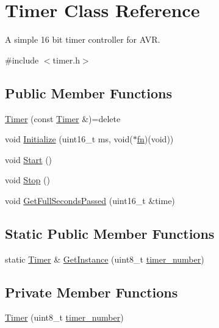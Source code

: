 \hypertarget{class_timer}{}\section{Timer Class Reference}
\label{class_timer}


A simple 16 bit timer controller for A\+VR.  




{\ttfamily \#include $<$timer.\+h$>$}

\subsection*{Public Member Functions}
\begin{DoxyCompactItemize}
\item 
\hyperlink{class_timer_ae6b73141ad1d5029d3782d14d2fd5ff0}{Timer} (const \hyperlink{class_timer}{Timer} \&)=delete
\item 
void \hyperlink{class_timer_a04ed0eb1468656c271645c2165bbe147}{Initialize} (uint16\+\_\+t ms, void($\ast$\hyperlink{class_timer_af44fd5c977c119c25af6aeee6f7cdc7a}{fn})(void))
\item 
void \hyperlink{class_timer_a4e607b129b392c11adddd9641a320436}{Start} ()
\item 
void \hyperlink{class_timer_a6379e797f968aaee6ac3bb12dc6b81c5}{Stop} ()
\item 
void \hyperlink{class_timer_ad45285aacc47697bea2bd0dce06a3e4d}{Get\+Full\+Seconds\+Passed} (uint16\+\_\+t \&time)
\end{DoxyCompactItemize}
\subsection*{Static Public Member Functions}
\begin{DoxyCompactItemize}
\item 
static \hyperlink{class_timer}{Timer} \& \hyperlink{class_timer_a5a9960ef2a5394a76b4b024cae1a86a3}{Get\+Instance} (uint8\+\_\+t \hyperlink{class_timer_a3c813be60ee224a8d6b252a83dfe16d3}{timer\+\_\+number})
\end{DoxyCompactItemize}
\subsection*{Private Member Functions}
\begin{DoxyCompactItemize}
\item 
\hyperlink{class_timer_a609e586dbc0fdc159fc6fd490fcc1ae3}{Timer} (uint8\+\_\+t \hyperlink{class_timer_a3c813be60ee224a8d6b252a83dfe16d3}{timer\+\_\+number})
\end{DoxyCompactItemize}

